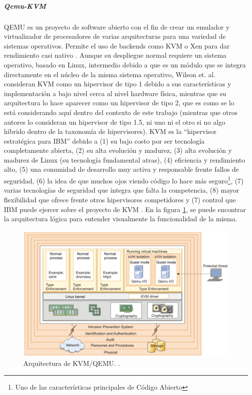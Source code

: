 \subparagraph{Qemu-KVM}
QEMU es un proyecto de software abierto con el fin de crear un emulador y virtualizador de procesadores de varias arquitecturas para una variedad de sistemas operativos. Permite el uso de backends como KVM o Xen para dar rendimiento casi nativo \citep{QEMU}. Aunque su despliegue normal requiere un sistema operativo, basado en Linux, intermedio debido a que es un módulo que se integra directamente en el núcleo de la misma sistema operativo, Wilson et. al. consideran KVM como un hipervisor de tipo 1 debido a sus características y implementación a bajo nivel cerca al nivel hardware física, mientras que su arquitectura lo hace aparecer como un hipervisor de tipo 2, que es como se lo está considerando aquí dentro del contexto de este trabajo (mientras que otros autores lo consideran un hipervisor de tipo 1.5, ni uno ni el otro si no algo híbrido dentro de la taxonomía de hipervisores). KVM es la “hipervisor estratégica para IBM” debido a (1) su bajo costo por ser tecnología completamente abierta, (2) su alta evolución y madurez, (3) alta evolución y madurez de Linux (su tecnología fundamental atras), (4) eficiencia y rendimiento alto, (5) una comunidad de desarrollo muy activa y responsable frente fallos de seguridad, (6) la idea de que muchos ojos viendo código lo hace más seguro\footnote{Uno de las características principales de Código Abierto}, (7) varias tecnologías de seguridad que integra que falta la competencia, (8) mayor flexibilidad que ofrece frente otros hipervisores competidores y (7) control que IBM puede ejercer sobre el proyecto de KVM \citep{IBM-KVM-Security}. En la figura \ref{KVM-Arq}, se puede encontrar la arquitectura lógica para entender visualmente la funcionalidad de la misma.
  

\begin{figure}
  \begin{center}
      \includegraphics[width=\textwidth]{Figures/kvm-arq.png}
  \end{center}
  \caption{Arquitectura de KVM/QEMU. \citep{IBM-KVM-Security}.}
  \label{KVM-Arq}
\end{figure}

